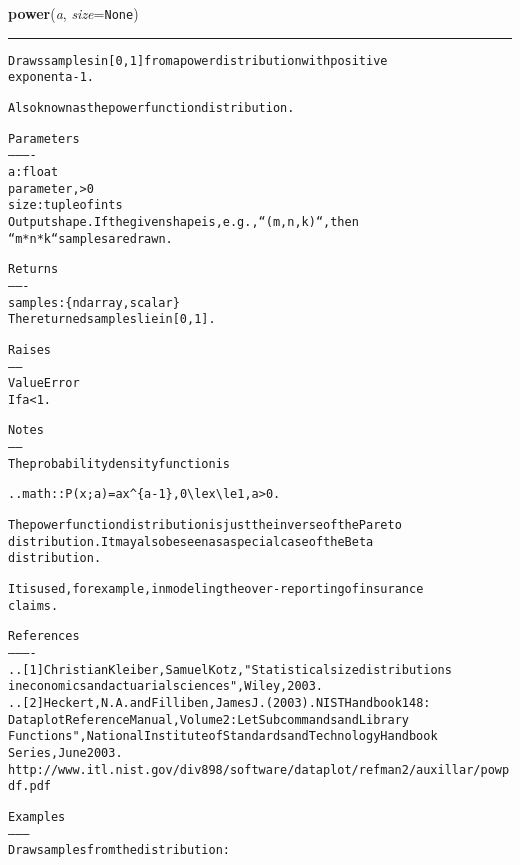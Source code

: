     \label{QSTK:qstklearn:mldiagnostics:power}

    \vspace{0.5ex}

\hspace{.8\funcindent}\begin{boxedminipage}{\funcwidth}

    \raggedright \textbf{power}(\textit{a}, \textit{size}={\tt None})

    \vspace{-1.5ex}

    \rule{\textwidth}{0.5\fboxrule}
\setlength{\parskip}{2ex}
\begin{alltt}
Draws samples in [0, 1] from a power distribution with positive
exponent a - 1.

Also known as the power function distribution.

Parameters
----------
a : float
    parameter, {\textgreater} 0
size : tuple of ints
    Output shape.  If the given shape is, e.g., ``(m, n, k)``, then
            ``m * n * k`` samples are drawn.

Returns
-------
samples : \{ndarray, scalar\}
    The returned samples lie in [0, 1].

Raises
------
ValueError
    If a{\textless}1.

Notes
-----
The probability density function is

.. math:: P(x; a) = ax{\textasciicircum}\{a-1\}, 0 {\textbackslash}le x {\textbackslash}le 1, a{\textgreater}0.

The power function distribution is just the inverse of the Pareto
distribution. It may also be seen as a special case of the Beta
distribution.

It is used, for example, in modeling the over-reporting of insurance
claims.

References
----------
.. [1] Christian Kleiber, Samuel Kotz, "Statistical size distributions
       in economics and actuarial sciences", Wiley, 2003.
.. [2] Heckert, N. A. and Filliben, James J. (2003). NIST Handbook 148:
       Dataplot Reference Manual, Volume 2: Let Subcommands and Library
       Functions", National Institute of Standards and Technology Handbook
       Series, June 2003.
       http://www.itl.nist.gov/div898/software/dataplot/refman2/auxillar/powpdf.pdf

Examples
--------
Draw samples from the distribution:


\end{alltt}
\end{boxedminipage}
